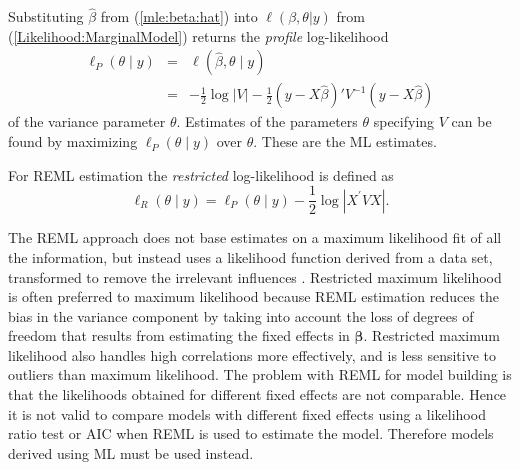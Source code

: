 \documentclass[12pt, a4paper]{report}
\theoremstyle{plain}
\theoremstyle{definition}
\theoremstyle{remark}
\begin{document}
	Substituting $\hat{\beta}$ from (\ref{mle:beta:hat}) into $\ell(\beta, \theta|y)$ from (\ref{Likelihood:MarginalModel}) returns the \emph{profile} log-likelihood
	\begin{eqnarray*}
		\ell_P(\theta \mid y) &=& \ell(\hat{\beta}, \theta \mid y) \\
		&=& -\frac{1}{2} \log |V| -\frac{1}{2}(y - X \hat{\beta})'V^{-1}(y - X \hat{\beta})
	\end{eqnarray*}
	of the variance parameter $\theta.$ Estimates of the parameters $\theta$ specifying $V$ can be found by maximizing $\ell_P(\theta \mid y)$ over $\theta.$ These are the ML estimates.
	
	For REML estimation the \emph{restricted} log-likelihood is defined as
	\[
	\ell_R(\theta \mid y) =
	\ell_P(\theta \mid y) -\frac{1}{2} \log |X^\prime VX |.
	\]
	
	The REML approach does not base estimates on a maximum likelihood fit of all the information, but instead uses a likelihood function derived from a data set, transformed to remove the irrelevant influences \citep{REMLDefine}.
	Restricted maximum likelihood is often preferred to maximum likelihood because REML estimation reduces the bias in the variance component by taking into account the loss of degrees of freedom that results
	from estimating the fixed effects in $\boldsymbol{\beta}$. Restricted maximum likelihood also handles high correlations more effectively, and is less sensitive to outliers than maximum likelihood.  The problem with REML for model building is that the likelihoods obtained for different fixed effects are not comparable. Hence it is not valid to compare models with different fixed effects using a likelihood ratio test or AIC when REML is used to
	estimate the model. Therefore models derived using ML must be used instead.
	
\end{document}
